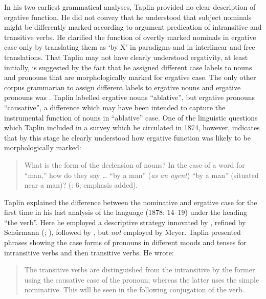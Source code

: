 In his two earliest grammatical analyses, Taplin provided no clear description of ergative function. He did not convey that he understood that subject nominals might be differently marked according to argument predication of intransitive and transitive verbs. He clarified the function of overtly marked nominals in ergative case only by translating them as `by X' in paradigms and in interlinear and free translations. That Taplin may not have clearly understood ergativity, at least initially, is suggested by the fact that he assigned different case labels to nouns and pronouns that are morphologically marked for ergative case. The only other corpus grammarian to assign different labels to ergative nouns and ergative pronouns was \citet{moorhouse_vocabulary_1846}. Taplin labelled ergative nouns “ablative'', but ergative pronouns “causative'', a difference which may have been intended to capture the instrumental function of nouns in “ablative” case. One of the linguistic questions which Taplin included in a survey which he circulated in 1874, however, indicates that by this stage he clearly understood how ergative function was likely to be morphologically marked:

\begin{quote}
What is the form of the declension of nouns? In the case of a word for “man,” how do they say … “by a man” (\textit{as an agent}) “by a man” (situated near a man)? (\citeyear{taplin_1879a_nodate}: 6; emphasis added).
\end{quote}


Taplin explained the difference between the nominative and ergative case for the first time in his last analysis of the language (1878: 14--19) under the heading “the verb''. Here he employed a descriptive strategy innovated by \citet{teichelmann_outlines_1840}, refined by Schürmann (\citeyear{schurmann_letter_1844}; ), followed by \citet{moorhouse_vocabulary_1846}, but \textit{not} employed by Meyer. Taplin presented phrases showing the case forms of pronouns in different moods and tenses for intransitive verbs and then transitive verbs. He wrote:

\begin{quote}
The transitive verbs are distinguished from the intransitive by the former using the causative case of the pronoun; whereas the latter uses the simple nominative. This will be seen in the following conjugation of the verb. \citep[18]{taplin_grammar_1878}
\end{quote}

